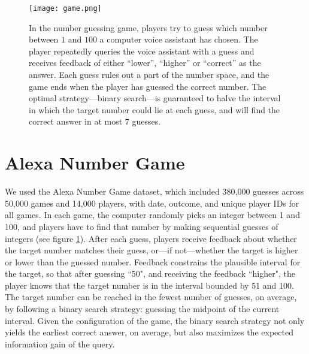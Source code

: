 \documentclass[10pt,letterpaper]{article}
\begin{document}
\begin{figure}[t]
    \texttt{[image: game.png]}
    \vspace{-8mm}
    \caption{In the number guessing game, players try to guess which number between $1$ and $100$ a computer voice assistant has chosen.  The player repeatedly queries the voice assistant with a guess and receives feedback of either \enquote{lower}, \enquote{higher} or \enquote{correct} as the answer. Each guess rules out a part of the number space, and the game ends when the player has guessed the correct number. 
    The optimal strategy---binary search---is guaranteed to halve the interval in which the target number could lie at each guess, and will find the correct answer in at most 7 guesses.
    }
    \label{fig:the_game}
    \vspace{-2mm}
\end{figure}



\section{Alexa Number Game}

We used the Alexa Number Game dataset, which included 380,000 guesses across 50,000 games and 14,000 players, with date, outcome, and unique player IDs for all games. 
In each game, the computer randomly picks an integer between 1 and 100, and players have to find that number by making sequential guesses of integers (see figure \ref{fig:the_game}).
After each guess, players receive feedback about whether the target number matches their guess, or---if not---whether the target is higher or lower than the guessed number. 
Feedback constrains the plausible interval for the target, so that after guessing ``50", and receiving the feedback ``higher", the player knows that the target number is in the interval bounded by 51 and 100.
The target number can be reached in the fewest number of guesses, on average, by following a binary search strategy: guessing the midpoint of the current interval. 
Given the configuration of the game, the binary search strategy not only yields the earliest correct answer, on average, but also maximizes the expected information gain of the query.
\end{document}
